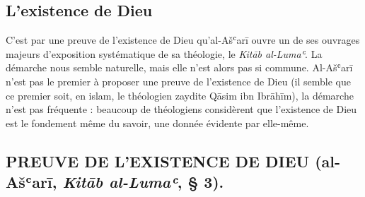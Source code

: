  
  
  \subsection{L'existence de Dieu}
  
 

C'est par une preuve de l'existence de Dieu qu'al-Ašʿarī ouvre un de ses
ouvrages majeurs d'exposition systématique de sa théologie, le
\emph{Kitāb al-Lumaʿ}. La démarche nous
semble naturelle, mais elle n'est alors pas si commune. Al-Ašʿarī n'est
pas le premier à proposer une preuve de l'existence de Dieu (il semble
que ce premier soit, en islam, le théologien zaydite Qāsim ibn Ibrāhīm),
la démarche n'est pas fréquente : beaucoup de théologiens considèrent
que l'existence de Dieu est le fondement même du savoir, une donnée
évidente par elle-même.


\subsection{PREUVE DE L'EXISTENCE DE DIEU (al-Ašʿarī, \emph{Kitāb al-Lumaʿ},
§ 3).}

